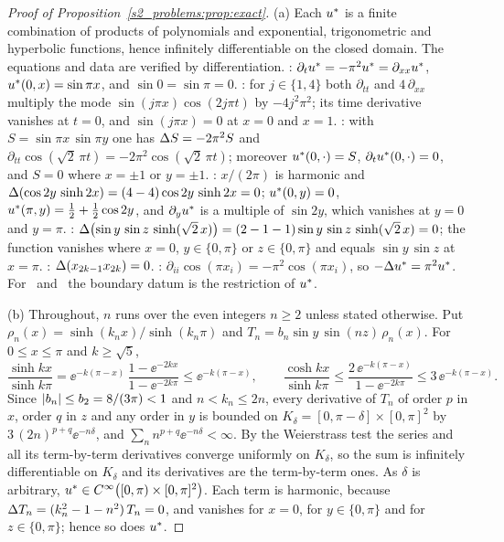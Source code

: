 \begin{proof}[Proof of Proposition~\ref{s2_problems:prop:exact}]
(a) Each $u^{*}$ is a finite combination of products of polynomials and exponential,
trigonometric and hyperbolic functions, hence infinitely differentiable on the closed
domain. The equations and data are verified by differentiation.
\PH: $\partial_tu^{*}=-\pi^2u^{*}=\partial_{xx}u^{*}$, $u^{*}(0,x)=\sin\pi x$, and
$\sin 0=\sin\pi=0$.
\PWone: for $j\in\{1,4\}$ both $\partial_{tt}$ and $4\,\partial_{xx}$ multiply the mode
$\sin(j\pi x)\cos(2j\pi t)$ by $-4j^2\pi^2$; its time derivative vanishes at $t=0$, and
$\sin(j\pi x)=0$ at $x=0$ and $x=1$.
\PWtwo: with $S=\sin\pi x\,\sin\pi y$ one has $\Delta S=-2\pi^2S$ and
$\partial_{tt}\cos(\sqrt2\,\pi t)=-2\pi^2\cos(\sqrt2\,\pi t)$; moreover $u^{*}(0,\cdot)=S$,
$\partial_tu^{*}(0,\cdot)=0$, and $S=0$ where $x=\pm1$ or $y=\pm1$.
\PLtwo: $x/(2\pi)$ is harmonic and $\Delta(\cos 2y\,\sinh 2x)=(4-4)\cos 2y\,\sinh 2x=0$;
$u^{*}(0,y)=0$, $u^{*}(\pi,y)=\tfrac12+\tfrac12\cos 2y$, and $\partial_yu^{*}$ is a multiple of
$\sin 2y$, which vanishes at $y=0$ and $y=\pi$.
\PLthreeS: $\Delta\bigl(\sin y\,\sin z\,\sinh(\sqrt2\,x)\bigr)=(2-1-1)\sin y\,\sin z\,\sinh(\sqrt2\,x)=0$;
the function vanishes where $x=0$, $y\in\{0,\pi\}$ or $z\in\{0,\pi\}$ and equals
$\sin y\,\sin z$ at $x=\pi$.
\Pone: $\Delta(x_{2k-1}x_{2k})=0$.
\Ptwo: $\partial_{ii}\cos(\pi x_i)=-\pi^2\cos(\pi x_i)$, so $-\Delta u^{*}=\pi^2u^{*}$.
For \Pone\ and \Ptwo\ the boundary datum is the restriction of $u^{*}$.

(b) Throughout, $n$ runs over the even integers $n\ge2$ unless stated otherwise. Put
$\rho_n(x)=\sinh(k_nx)/\sinh(k_n\pi)$ and $T_n=b_n\sin y\,\sin(nz)\,\rho_n(x)$. For
$0\le x\le\pi$ and $k\ge\sqrt5$,
\begin{equation}\label{sA_proofs:eq:decay}
\frac{\sinh kx}{\sinh k\pi}
=\ee^{-k(\pi-x)}\,\frac{1-\ee^{-2kx}}{1-\ee^{-2k\pi}}\le\ee^{-k(\pi-x)},
\qquad
\frac{\cosh kx}{\sinh k\pi}\le\frac{2\,\ee^{-k(\pi-x)}}{1-\ee^{-2k\pi}}\le 3\,\ee^{-k(\pi-x)} .
\end{equation}
Since $\lvert b_n\rvert\le b_2=8/(3\pi)<1$ and $n<k_n\le 2n$, every derivative of $T_n$ of order $p$
in $x$, order $q$ in $z$ and any order in $y$ is bounded on
$K_\delta=[0,\pi-\delta]\times[0,\pi]^2$ by $3\,(2n)^{p+q}\ee^{-n\delta}$, and
$\sum_n n^{p+q}\ee^{-n\delta}<\infty$. By the Weierstrass test the series and all its
term-by-term derivatives converge uniformly on $K_\delta$, so the sum is infinitely
differentiable on $K_\delta$ and its derivatives are the term-by-term ones. As $\delta$ is
arbitrary, $u^{*}\in C^\infty\bigl([0,\pi)\times[0,\pi]^2\bigr)$. Each term is harmonic,
because $\Delta T_n=(k_n^2-1-n^2)\,T_n=0$, and vanishes for $x=0$, for $y\in\{0,\pi\}$ and for
$z\in\{0,\pi\}$; hence so does $u^{*}$.


\end{proof}
